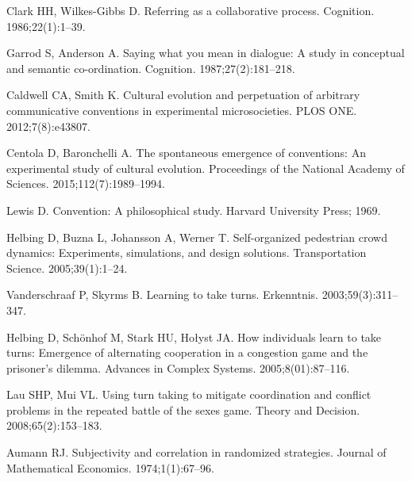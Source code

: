 \documentclass[10pt,letterpaper]{article}
\begin{document}
\begin{thebibliography}{10}

Clark HH, Wilkes-Gibbs D.
\newblock Referring as a collaborative process.
\newblock Cognition. 1986;22(1):1--39.

Garrod S, Anderson A.
\newblock Saying what you mean in dialogue: A study in conceptual and semantic
  co-ordination.
\newblock Cognition. 1987;27(2):181--218.

Caldwell CA, Smith K.
\newblock Cultural evolution and perpetuation of arbitrary communicative
  conventions in experimental microsocieties.
\newblock PLOS ONE. 2012;7(8):e43807.

Centola D, Baronchelli A.
\newblock The spontaneous emergence of conventions: An experimental study of
  cultural evolution.
\newblock Proceedings of the National Academy of Sciences.
  2015;112(7):1989--1994.

Lewis D.
\newblock Convention: A philosophical study.
\newblock Harvard University Press; 1969.

Helbing D, Buzna L, Johansson A, Werner T.
\newblock Self-organized pedestrian crowd dynamics: Experiments, simulations,
  and design solutions.
\newblock Transportation Science. 2005;39(1):1--24.

Vanderschraaf P, Skyrms B.
\newblock Learning to take turns.
\newblock Erkenntnis. 2003;59(3):311--347.

Helbing D, Sch{\"o}nhof M, Stark HU, Ho{\l}yst JA.
\newblock How individuals learn to take turns: Emergence of alternating
  cooperation in a congestion game and the prisoner's dilemma.
\newblock Advances in Complex Systems. 2005;8(01):87--116.

Lau SHP, Mui VL.
\newblock Using turn taking to mitigate coordination and conflict problems in
  the repeated battle of the sexes game.
\newblock Theory and Decision. 2008;65(2):153--183.

Aumann RJ.
\newblock Subjectivity and correlation in randomized strategies.
\newblock Journal of Mathematical Economics. 1974;1(1):67--96.


\end{thebibliography}
\end{document}
